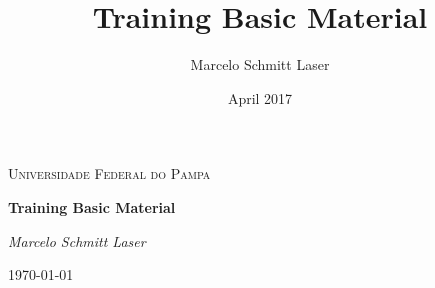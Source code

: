 \documentclass{report}
\title{Training Basic Material}
\author{Marcelo Schmitt Laser}
\date{April 2017}
\begin{document}

\begin{titlepage}
	\centering
	\par\vspace{3cm}
	{\scshape\LARGE Universidade Federal do Pampa \par}
	\vspace{4cm}
	{\huge\bfseries Training Basic Material\par}
	\vspace{2cm}
	{\Large\itshape Marcelo Schmitt Laser\par}

	\vfill

	{\large \today\par}
\end{titlepage}



\printglossary[type=\acronymtype]
\printglossary

\tableofcontents










\begin{appendices}

\end{appendices}



\end{document}
